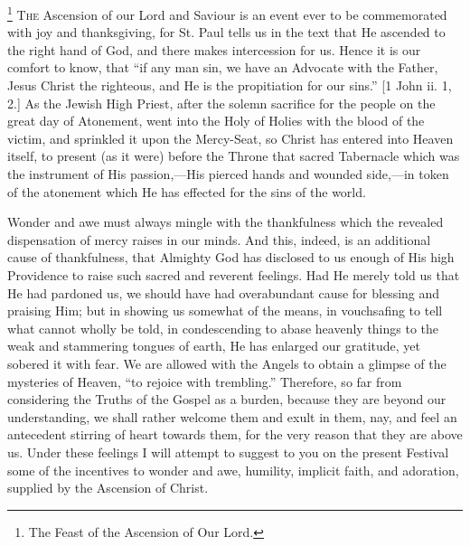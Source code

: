 \footnote{The Feast of the Ascension of Our Lord.} T\textsc{he} Ascension of our
Lord and Saviour is an event ever to be commemorated with joy and
thanksgiving, for St. Paul tells us in the text that He ascended to the
right hand of God, and there makes intercession for us. Hence it is our
comfort to know, that ``if any man sin, we have an Advocate with the
Father, Jesus Christ the righteous, and He is the propitiation for our
sins.'' [1 John ii. 1, 2.] As the Jewish High Priest, after the
solemn sacrifice for the people on the great day of Atonement, went into
the Holy of Holies with the blood of the victim, and sprinkled it upon
the Mercy-Seat, so Christ has entered into Heaven itself, to present (as
it were) before the Throne that sacred Tabernacle which was the
instrument of His passion,—His pierced hands and wounded side,—in
token of the atonement which He has effected for the sins of the world.

Wonder and awe must always mingle with the thankfulness which the
revealed dispensation of mercy raises in our minds. And this, indeed, is
an additional cause of thankfulness, that Almighty God has disclosed to
us enough of His high Providence to raise such sacred and reverent
feelings. Had He merely told us that He had pardoned us, we should have
had overabundant cause for blessing and praising Him; but in showing us
somewhat of the means, in vouchsafing to tell what cannot wholly be
told, in condescending to abase heavenly things to the weak and
stammering tongues of earth, He has enlarged our gratitude, yet sobered
it with fear. We are allowed with the Angels to obtain a glimpse of the
mysteries of Heaven, ``to rejoice with trembling.'' Therefore,
so far from considering the Truths of the Gospel as a burden, because
they are beyond our understanding, we shall rather welcome them and
exult in them, nay, and feel an antecedent stirring of heart towards
them, for the very reason that they are above us. Under these feelings I
will attempt to suggest to you on the present Festival some of the
incentives to wonder and awe, humility, implicit faith, and adoration,
supplied by the Ascension of Christ.

